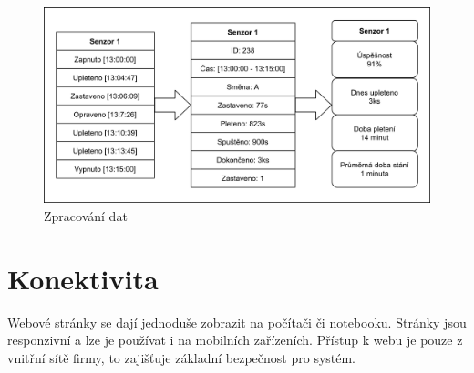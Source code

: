 \begin{figure}[htbp]
    \centering
    \includegraphics[width=\textwidth]{img/Princip.png}
    \caption{Zpracování dat}
    \label{fig:princip}
\end{figure}

\section{Konektivita}
Webové stránky se dají jednoduše zobrazit na počítači či notebooku.
Stránky jsou responzivní a lze je používat i na mobilních zařízeních.
Přístup k webu je pouze z vnitřní sítě firmy, to zajišťuje základní bezpečnost pro systém.


\newpage